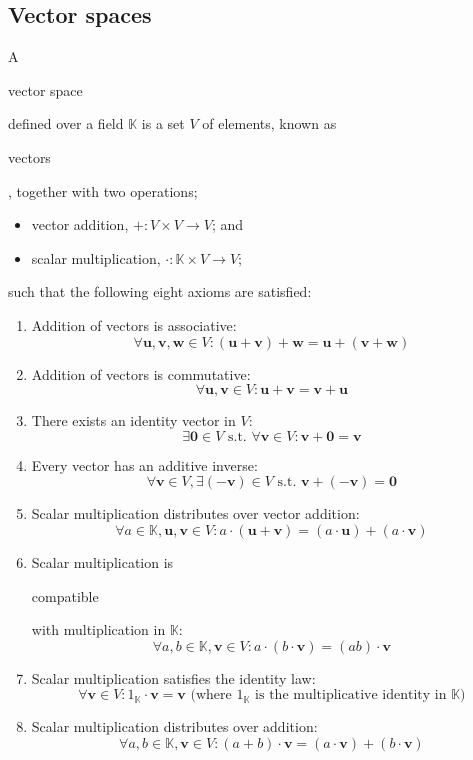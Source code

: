 \documentclass{article}
\newenvironment{itemized}{
\begin{itemize}
\setlength{\itemsep}{0pt}
\setlength{\parskip}{0pt}
\setlength{\parsep}{0pt}
}{\end{itemize}}
\newenvironment{enumerated}{
\begin{enumerate}
\setlength{\itemsep}{0pt}
\setlength{\parskip}{0pt}
\setlength{\parsep}{0pt}
}{\end{enumerate}}
\renewcommand{\vec}[1]{\mathbf{#1}}
\begin{document}
\subsection*{Vector spaces}
A \begin{em}vector space\end{em} defined over a field $\mathbb{K}$ is a set $V$ of elements, known as \begin{em}vectors\end{em}, together with two operations;
\begin{itemized}
  \item vector addition, $+ : V \times V \rightarrow V$; and
  \item scalar multiplication, $\cdot : \mathbb{K} \times V \rightarrow V;$
\end{itemized}
such that the following eight axioms are satisfied:
\begin{enumerated}
  \item Addition of vectors is associative:
  $$ \forall \vec{u}, \vec{v}, \vec{w} \in V : (\vec{u} + \vec{v}) + \vec{w} = \vec{u} + (\vec{v} + \vec{w}) $$
  \item Addition of vectors is commutative:
  $$ \forall \vec{u}, \vec{v} \in V : \vec{u} + \vec{v} = \vec{v} + \vec{u} $$
  \item There exists an identity vector in $V$:
  $$ \exists \vec{0} \in V \text{ s.t. } \forall \vec{v} \in V : \vec{v} + \vec{0} = \vec{v} $$
  \item Every vector has an additive inverse:
  $$ \forall \vec{v} \in V, \exists \vec{(-v)} \in V \text{ s.t. } \vec{v} + \vec{(-v)} = \vec{0} $$
  \item Scalar multiplication distributes over vector addition:
  $$ \forall a \in \mathbb{K}, \vec{u}, \vec{v} \in V : a \cdot (\vec{u} + \vec{v}) = (a \cdot \vec{u}) + (a \cdot \vec{v}) $$
  \item Scalar multiplication is \begin{em}compatible\end{em} with multiplication in $\mathbb{K}$:
  $$ \forall a,b \in \mathbb{K}, \vec{v} \in V : a \cdot (b \cdot \vec{v}) = (ab) \cdot \vec{v} $$
  \item Scalar multiplication satisfies the identity law:
  $$ \forall \vec{v} \in V : 1_{\mathbb{K}} \cdot \vec{v} = \vec{v} \text{ (where $1_{\mathbb{K}}$ is the multiplicative identity in $\mathbb{K}$)} $$
  \item Scalar multiplication distributes over addition:
  $$ \forall a, b \in \mathbb{K}, \vec{v} \in V : (a + b) \cdot \vec{v} = (a \cdot \vec{v}) + (b \cdot \vec{v}) $$
\end{enumerated}
\end{document}
